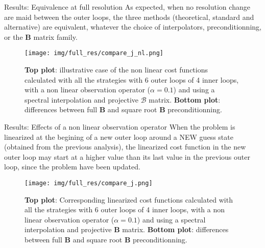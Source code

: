 \documentclass[8pt]{beamer}
\begin{document}

\begin{frame}{Results: Equivalence at full resolution}
 As expected, when no resolution change are maid between the outer loops, the three methods (theoretical, standard and alternative) are equivalent, whatever the choice of interpolators, preconditionning, or the $\mathbf{B}$ matrix family.
 \begin{center}
\begin{figure}
  \begin{minipage}[c]{0.67\textwidth}
    \texttt{[image: img/full\_res/compare\_j\_nl.png]}
  \end{minipage}\hfill
  \begin{minipage}[c]{0.27\textwidth}
    \caption{\textbf{Top plot}: illustrative case of the non linear cost functions calculated with all the strategies with 6 outer loops of 4 inner loops, with a non linear observation operator ($\alpha=0.1$) and using a spectral interpolation and projective $\mathcal{B}$ matrix. \textbf{Bottom plot}: differences between full $\mathbf{B}$ and square root $\mathbf{B}$ preconditionning.}
  \end{minipage}
\end{figure}
\end{center}
\end{frame}

\begin{frame}{Results: Effects of a non linear observation operator}
When the problem is linearized at the begining of a new outer loop around a NEW guess state (obtained from the previous analysis), the linearized cost function in the new outer loop may start at a higher value than its last value in the previous outer loop, since the problem have been updated.
\vspace{-0.2cm}
 \begin{center}
\begin{figure}
  \begin{minipage}[c]{0.67\textwidth}
    \texttt{[image: img/full\_res/compare\_j.png]}
  \end{minipage}\hfill
  \begin{minipage}[c]{0.23\textwidth}
    \caption{\textbf{Top plot}: Corresponding linearized cost functions calculated with all the strategies with 6 outer loops of 4 inner loops, with a non linear observation operator ($\alpha=0.1$) and using a spectral interpolation and projective $\mathbf{B}$ matrix. \textbf{Bottom plot}: differences between full $\mathbf{B}$ and square root $\mathbf{B}$ preconditionning.}
  \end{minipage}
\end{figure}
\end{center}
\end{frame}
\end{document}
